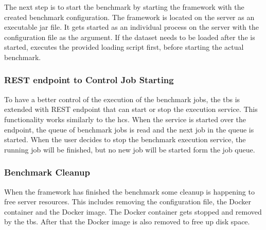 The next step is to start the benchmark by starting the \iguana{} framework with the created benchmark configuration.
The \iguana{} framework is located on the server as an executable jar file.
It gets started as an individual process on the server with the configuration file as the argument.
If the dataset needs to be loaded after the \ts{} is started, \iguana{} executes the provided loading script first, before starting the actual benchmark.


\subsubsection{REST endpoint to Control Job Starting}
To have a better control of the execution of the benchmark jobs, the \ac{tbs} is extended with REST endpoint that can start or stop the execution service.
This functionality works similarly to the \ac{hcs}.
When the service is started over the endpoint, the queue of benchmark jobs is read and the next job in the queue is started.
When the user decides to stop the benchmark execution service, the running job will be finished, but no new job will be started form the job queue.


\subsubsection{Benchmark Cleanup}
When the \iguana{} framework has finished the benchmark some cleanup is happening to free server resources.
This includes removing the \iguana{} configuration file, the Docker container and the Docker image.
The Docker container gets stopped and removed by the \ac{tbs}.
After that the Docker image is also removed to free up disk space.
